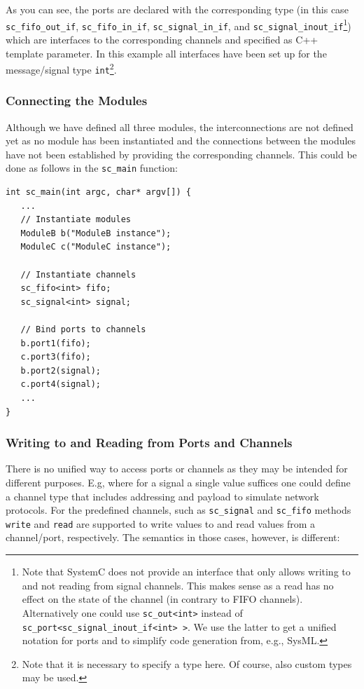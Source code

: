 \documentclass{template/openetcs_article}
\begin{document}
As you can see, the ports are declared with the corresponding type (in this case \verb|sc_fifo_out_if|, \verb|sc_fifo_in_if|, \verb|sc_signal_in_if|, and \verb|sc_signal_inout_if|\footnote{Note that SystemC does not provide an interface that only allows writing to and not reading from signal channels. This makes sense as a read has no effect on the state of the channel (in contrary to FIFO channels). Alternatively one could use \texttt{sc\_out<int>} instead of \texttt{sc\_port<sc\_signal\_inout\_if<int> >}. We use the latter to get a unified notation for ports and to simplify code generation from, e.g., SysML.}) which are interfaces to the corresponding channels and specified as C++ template parameter. In this example all interfaces have been set up for the message/signal type \verb|int|\footnote{Note that it is necessary to specify a type here. Of course, also custom types may be used.}.

\subsubsection{Connecting the Modules}
Although we have defined all three modules, the interconnections are not defined yet as no module has been instantiated and the connections between the modules have not been established by providing the corresponding channels. This could be done as follows in the \verb|sc_main| function:

{\small
\begin{lstlisting}
int sc_main(int argc, char* argv[]) {
   ...
   // Instantiate modules
   ModuleB b("ModuleB instance");
   ModuleC c("ModuleC instance");

   // Instantiate channels
   sc_fifo<int> fifo;
   sc_signal<int> signal;

   // Bind ports to channels
   b.port1(fifo);
   c.port3(fifo);
   b.port2(signal);
   c.port4(signal);
   ...
}
\end{lstlisting}
}

\subsubsection{Writing to and Reading from Ports and Channels}

There is no unified way to access ports or channels as they may be intended for different purposes. E.g, where for a signal a single value suffices one could define a channel type that includes addressing and payload to simulate network protocols. For the predefined channels, such as \verb|sc_signal| and \verb|sc_fifo| methods \verb|write| and \verb|read| are supported to write values to and read values from a channel/port, respectively. The semantics in those cases, however, is different:
\end{document}
